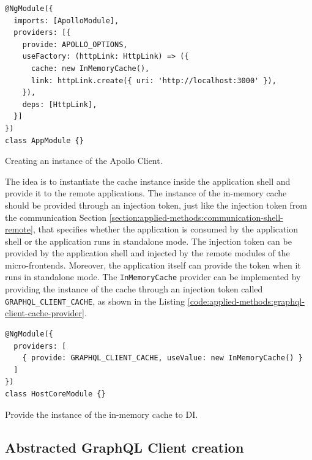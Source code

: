 \ifshowListings
\begin{listing}[H]
\begin{verbatim}
@NgModule({
  imports: [ApolloModule],
  providers: [{
    provide: APOLLO_OPTIONS,
    useFactory: (httpLink: HttpLink) => ({
      cache: new InMemoryCache(),
      link: httpLink.create({ uri: 'http://localhost:3000' }),
    }),
    deps: [HttpLink],
  }]
})
class AppModule {}
\end{verbatim}
\caption{Creating an instance of the Apollo Client.}\label{code:applied-methods:creating-the-apollo-client}
\end{listing}
\fi

\noindent The idea is to instantiate the cache instance inside the application shell and provide it to the remote applications. The instance of the in-memory cache should be provided through an injection token, just like the injection token from the communication Section \ref{section:applied-methods:communication-shell-remote}, that specifies whether the application is consumed by the application shell or the application runs in standalone mode. The injection token can be provided by the application shell and injected by the remote modules of the micro-frontends. Moreover, the application itself can provide the token when it runs in standalone mode. The \texttt{InMemoryCache} provider can be implemented by providing the instance of the cache through an injection token called \texttt{GRAPHQL\_CLIENT\_CACHE}, as shown in the Listing \ref{code:applied-methods:graphql-client-cache-provider}.

\ifshowListings
\begin{listing}[H]
\begin{verbatim}
@NgModule({
  providers: [
    { provide: GRAPHQL_CLIENT_CACHE, useValue: new InMemoryCache() }
  ]
})
class HostCoreModule {}
\end{verbatim}
\caption{Provide the instance of the in-memory cache to \ac{DI}.}\label{code:applied-methods:graphql-client-cache-provider}
\end{listing}
\fi

\subsection{Abstracted GraphQL Client creation}

